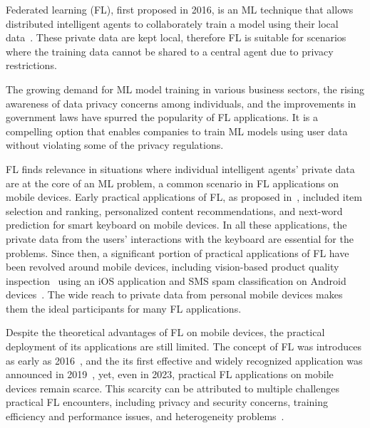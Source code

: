 \documentclass[conference]{IEEEtran}
\begin{document}

Federated learning (FL), first proposed in 2016, is an ML technique that
allows distributed intelligent agents to collaborately train a model using
their local data~\cite{mcmahan2017communication,yang2019federated}.
These private data are kept local,
therefore FL is suitable for scenarios where
the training data cannot be shared to a central agent due to
privacy restrictions.

The growing demand for ML model training in various business sectors,
the rising awareness of data privacy concerns among individuals,
and the improvements in government laws have spurred
the popularity of FL applications.
It is a compelling option that enables companies to train ML models using
user data without violating some of the privacy regulations.

FL finds relevance in situations where
individual intelligent agents' private data are at the core of an ML problem,
a common scenario in FL applications on mobile devices.
Early practical applications of FL,
as proposed in~\cite{bonawitz2019towards},
included item selection and ranking,
personalized content recommendations,
and next-word prediction for smart keyboard on mobile devices.
In all these applications,
the private data from the users' interactions with
the keyboard are essential for the problems.
Since then, a significant portion of practical applications of FL have been
revolved around mobile devices,
including vision-based product quality inspection~\cite{bharti2022edge} using
an iOS application and
SMS spam classification on Android devices~\cite{sriraman2022device}.
The wide reach to private data from personal mobile devices makes
them the ideal participants for many FL applications.

Despite the theoretical advantages of FL on mobile devices,
the practical deployment of its applications are still limited.
The concept of FL was introduces as early as 2016~\cite{mcmahan2017communication},
and the its first effective and widely recognized application
was announced in 2019~\cite{bonawitz2019towards},
yet, even in 2023, practical FL applications on mobile devices remain scarce.
This scarcity can be attributed to multiple challenges practical FL encounters,
including privacy and security concerns,
training efficiency and performance issues,
and heterogeneity problems~\cite{wen2023survey}.
\end{document}
